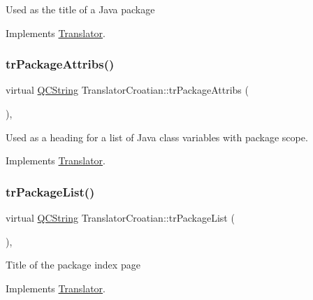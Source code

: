 Used as the title of a Java package 

Implements \mbox{\hyperlink{class_translator}{Translator}}.

\mbox{\label{class_translator_croatian_aab3bd717048978cc268622ce5cce1675}} 
\subsubsection{\texorpdfstring{trPackageAttribs()}{trPackageAttribs()}}
{\footnotesize\ttfamily virtual \mbox{\hyperlink{class_q_c_string}{Q\+C\+String}} Translator\+Croatian\+::tr\+Package\+Attribs (\begin{DoxyParamCaption}{ }\end{DoxyParamCaption})\hspace{0.3cm}{\ttfamily [inline]}, {\ttfamily [virtual]}}

Used as a heading for a list of Java class variables with package scope. 

Implements \mbox{\hyperlink{class_translator}{Translator}}.

\mbox{\label{class_translator_croatian_ab798b026103bae5d4d01591dc5f12edc}} 
\subsubsection{\texorpdfstring{trPackageList()}{trPackageList()}}
{\footnotesize\ttfamily virtual \mbox{\hyperlink{class_q_c_string}{Q\+C\+String}} Translator\+Croatian\+::tr\+Package\+List (\begin{DoxyParamCaption}{ }\end{DoxyParamCaption})\hspace{0.3cm}{\ttfamily [inline]}, {\ttfamily [virtual]}}

Title of the package index page 

Implements \mbox{\hyperlink{class_translator}{Translator}}.

\mbox{\label{class_translator_croatian_adb6bcb67f2e75e9d2471cd26fe0027dc}} 
